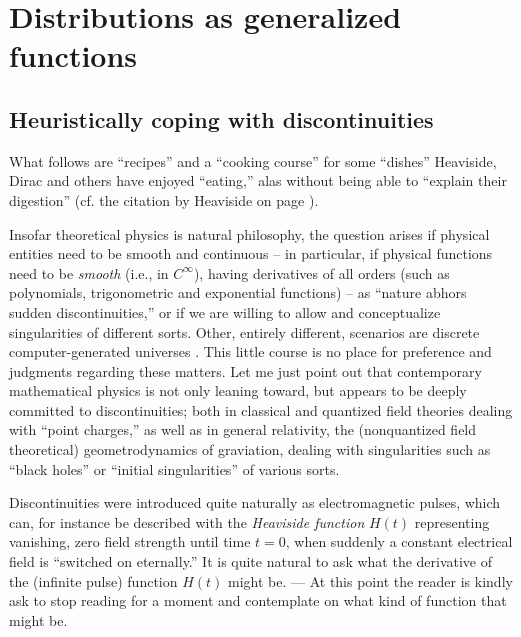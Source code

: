 \chapter{Distributions as generalized functions}
\label{2011-m-ch:gf}

\section{Heuristically coping with discontinuities}

What follows are ``recipes'' and a ``cooking course'' for some ``dishes'' Heaviside, Dirac and others
have enjoyed ``eating,'' alas without being able to ``explain their digestion''
(cf. the citation by Heaviside on page \pageref{2013-m-ch-intro-cooking}).

Insofar theoretical physics is natural philosophy,
the question arises if physical entities need to be smooth and continuous
--
in particular,
if physical functions need to be {\em smooth} (i.e., in $C^\infty$),
having derivatives of all orders  \cite{trench}
(such as polynomials, trigonometric and exponential functions)
--
as ``nature abhors sudden discontinuities,''
or if we are willing to allow and conceptualize singularities of different sorts.
Other, entirely different,
scenarios are discrete
\cite{zuse-94,zuse-69} computer-generated universes \cite{fredkin,toffoli:79,svozil-2005-cu}.
This little course is no place for preference and judgments regarding these matters.
Let me just point out that contemporary mathematical physics is not only leaning toward,
but appears to be deeply committed to discontinuities;
both in classical and quantized field theories dealing with
 ``point charges,''
as well as in general relativity,  the (nonquantized field theoretical)
geometrodynamics of graviation,
dealing with singularities such as ``black holes'' or ``initial singularities'' of various sorts.

Discontinuities were introduced quite naturally as electromagnetic pulses,
which can, for instance be described with the {\em Heaviside function}
$H(t)$ representing vanishing, zero field strength until time $t=0$, when suddenly a constant electrical field is
``switched on eternally.''
It is quite natural to ask what the derivative of the (infinite pulse) function $H(t)$ might be.
---
At this point the reader is kindly ask to stop reading for a moment and contemplate
on what kind of function that might be.

